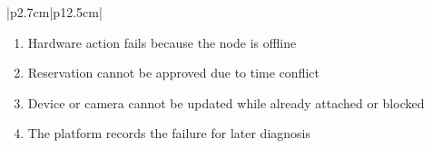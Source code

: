 \begin{table}[H]
\begin{tabular}{|p{2.7cm}|p{12.5cm}|}
\begin{minipage}[t]{\linewidth}
            \begin{enumerate}[topsep=0pt,itemsep=1pt,parsep=0pt,partopsep=0pt]
                \item Hardware action fails because the node is offline
                \item Reservation cannot be approved due to time conflict
                \item Device or camera cannot be updated while already attached or blocked
                \item The platform records the failure for later diagnosis
            \end{enumerate}
        \end{minipage}                                                           \\
        \hline
    \end{tabular}
    \label{tab:admin-infrastructure}
\end{table}

